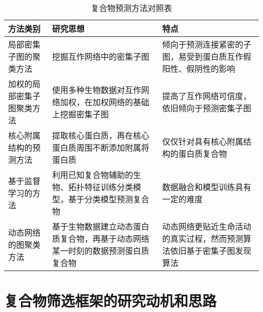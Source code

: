 \begin{table}[h]
  \centering
  \caption{复合物预测方法对照表}
  \label{tab:MethodSummary}
  \begin{tabular}{L{3cm}L{6cm}L{5cm}}
    \toprule
    \textbf{方法类别}          & \textbf{研究思想}                                                              & \textbf{特点}                                                          \\
    \midrule
    局部密集子图的聚类方法     & 挖掘互作网络中的密集子图                                                       & 倾向于预测连接紧密的子图，易受到蛋白质互作假阳性、假阴性的影响         \\\hline
    加权的局部密集子图聚类方法 & 使用多种生物数据对互作网络加权，在加权网络的基础上挖掘密集子图                 & 提高了互作网络可信度，依旧倾向于预测密集子图                           \\\hline
    核心附属结构的预测方法     & 提取核心蛋白质，再在核心蛋白质周围不断添加附属将蛋白质                         & 仅仅针对具有核心附属结构的蛋白质复合物                                 \\\hline
    基于监督学习的方法         & 利用已知复合物辅助的生物、拓扑特征训练分类模型，基于分类模型预测复合物         & 数据融合和模型训练具有一定的难度                                       \\\hline
    动态网络的图聚类方法       & 基于生物数据建立动态蛋白质复合物，再基于动态网络某一时刻的数据预测蛋白质复合物 & 动态网络更贴近生命活动的真实过程，然而预测算法依旧基于密集子图发现算法 \\
    \bottomrule
  \end{tabular}
\end{table}


\section{复合物筛选框架的研究动机和思路}
\label{section:intro:motivationAndThinking}

